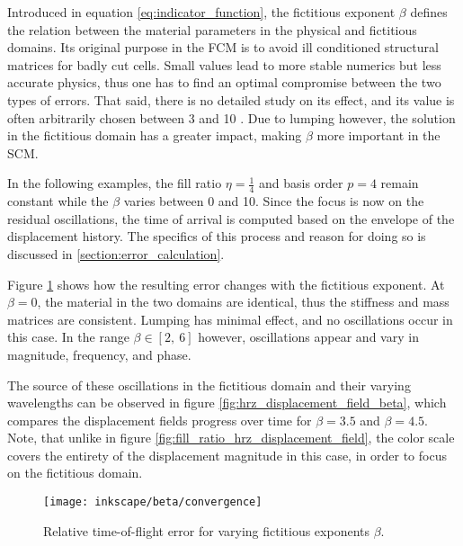 Introduced in equation \ref{eq:indicator_function}, the fictitious exponent $\beta$ defines the relation between the material parameters in the physical and fictitious domains. Its original purpose in the FCM is to avoid ill conditioned structural matrices for badly cut cells. Small values lead to more stable numerics but less accurate physics, thus one has to find an optimal compromise between the two types of errors. That said, there is no detailed study on its effect, and its value is often arbitrarily chosen between 3 and 10 \cite{Parvizian2007}. Due to lumping however, the solution in the fictitious domain has a greater impact, making $\beta$ more important in the SCM.

In the following examples, the fill ratio $\eta = \frac{1}{4}$ and basis order $p=4$ remain constant while the $\beta$ varies between 0 and 10. Since the focus is now on the residual oscillations, the time of arrival is computed based on the envelope of the displacement history. The specifics of this process and reason for doing so is discussed in \ref{section:error_calculation}.

Figure \ref{fig:beta_convergence} shows how the resulting error changes with the fictitious exponent. At $\beta = 0$, the material in the two domains are identical, thus the stiffness and mass matrices are consistent. Lumping has minimal effect, and no oscillations occur in this case. In the range $\beta \in [2,\ 6]$ however, oscillations appear and vary in magnitude, frequency, and phase.

The source of these oscillations in the fictitious domain and their varying wavelengths can be observed in figure \ref{fig:hrz_displacement_field_beta}, which compares the displacement fields progress over time for $\beta=3.5$ and $\beta=4.5$. Note, that unlike in figure \ref{fig:fill_ratio_hrz_displacement_field}, the color scale covers the entirety of the displacement magnitude in this case, in order to focus on the fictitious domain.

\begin{figure}[!h]
	\centering
	\texttt{[image: inkscape/beta/convergence]}
	\caption{Relative time-of-flight error for varying fictitious exponents $\beta$.}
	\label{fig:beta_convergence}
\end{figure}

